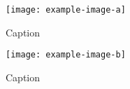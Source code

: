 \begin{figure}
    \centering
    \begin{minipage}[t]{0.49\columnwidth}
      \centering
        \texttt{[image: example-image-a]}
        \caption{Caption}
        \label{fig:Multifig1}
    \end{minipage}\hfill
    \begin{minipage}[t]{0.49\columnwidth}
      \centering
        \texttt{[image: example-image-b]}
        \caption{Caption}
        \label{fig:Multifig2}
    \end{minipage}%
\end{figure}